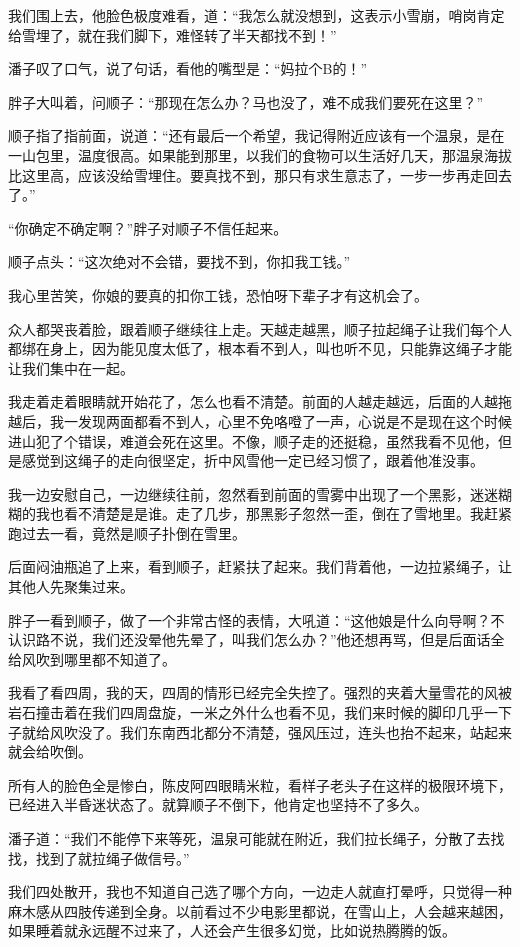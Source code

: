 我们围上去，他脸色极度难看，道：“我怎么就没想到，这表示小雪崩，哨岗肯定给雪埋了，就在我们脚下，难怪转了半天都找不到！”

潘子叹了口气，说了句话，看他的嘴型是：“妈拉个B的！”

胖子大叫着，问顺子：“那现在怎么办？马也没了，难不成我们要死在这里？”

顺子指了指前面，说道：“还有最后一个希望，我记得附近应该有一个温泉，是在一山包里，温度很高。如果能到那里，以我们的食物可以生活好几天，那温泉海拔比这里高，应该没给雪埋住。要真找不到，那只有求生意志了，一步一步再走回去了。”

“你确定不确定啊？”胖子对顺子不信任起来。

顺子点头：“这次绝对不会错，要找不到，你扣我工钱。”

我心里苦笑，你娘的要真的扣你工钱，恐怕呀下辈子才有这机会了。

众人都哭丧着脸，跟着顺子继续往上走。天越走越黑，顺子拉起绳子让我们每个人都绑在身上，因为能见度太低了，根本看不到人，叫也听不见，只能靠这绳子才能让我们集中在一起。

我走着走着眼睛就开始花了，怎么也看不清楚。前面的人越走越远，后面的人越拖越后，我一发现两面都看不到人，心里不免咯噔了一声，心说是不是现在这个时候进山犯了个错误，难道会死在这里。不像，顺子走的还挺稳，虽然我看不见他，但是感觉到这绳子的走向很坚定，折中风雪他一定已经习惯了，跟着他准没事。

我一边安慰自己，一边继续往前，忽然看到前面的雪雾中出现了一个黑影，迷迷糊糊的我也看不清楚是是谁。走了几步，那黑影子忽然一歪，倒在了雪地里。我赶紧跑过去一看，竟然是顺子扑倒在雪里。

后面闷油瓶追了上来，看到顺子，赶紧扶了起来。我们背着他，一边拉紧绳子，让其他人先聚集过来。

胖子一看到顺子，做了一个非常古怪的表情，大吼道：“这他娘是什么向导啊？不认识路不说，我们还没晕他先晕了，叫我们怎么办？”他还想再骂，但是后面话全给风吹到哪里都不知道了。

我看了看四周，我的天，四周的情形已经完全失控了。强烈的夹着大量雪花的风被岩石撞击着在我们四周盘旋，一米之外什么也看不见，我们来时候的脚印几乎一下子就给风吹没了。我们东南西北都分不清楚，强风压过，连头也抬不起来，站起来就会给吹倒。

所有人的脸色全是惨白，陈皮阿四眼睛米粒，看样子老头子在这样的极限环境下，已经进入半昏迷状态了。就算顺子不倒下，他肯定也坚持不了多久。

潘子道：“我们不能停下来等死，温泉可能就在附近，我们拉长绳子，分散了去找找，找到了就拉绳子做信号。”

我们四处散开，我也不知道自己选了哪个方向，一边走人就直打晕呼，只觉得一种麻木感从四肢传递到全身。以前看过不少电影里都说，在雪山上，人会越来越困，如果睡着就永远醒不过来了，人还会产生很多幻觉，比如说热腾腾的饭。

